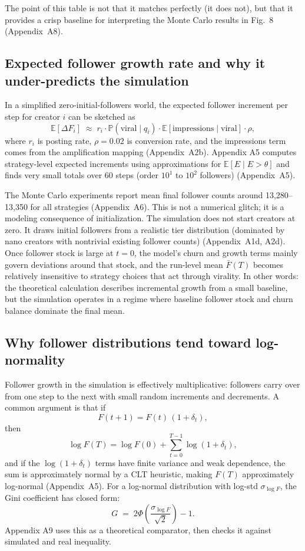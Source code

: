 \documentclass[10pt]{article}
\newcommand{\appref}[1]{(Appendix~#1)}
\newcommand{\figref}[1]{Fig.~#1}
\begin{document}
The point of this table is not that it matches perfectly (it does not), but that it provides a crisp baseline for interpreting the Monte Carlo results in \figref{8} \appref{A8}.

\subsection{Expected follower growth rate and why it under-predicts the simulation}
In a simplified zero-initial-followers world, the expected follower increment per step for creator \(i\) can be sketched as
\[
\mathbb{E}[\Delta F_i] \;\approx\; r_i \cdot \mathbb{P}(\text{viral}\mid q_i)\cdot \mathbb{E}[\text{impressions}\mid \text{viral}] \cdot \rho,
\]
where \(r_i\) is posting rate, \(\rho=0.02\) is conversion rate, and the impressions term comes from the amplification mapping \appref{A2b}. Appendix A5 computes strategy-level expected increments using approximations for \(\mathbb{E}[E\mid E>\theta]\) and finds very small totals over 60 steps (order \(10^1\) to \(10^2\) followers) \appref{A5}.

The Monte Carlo experiments report mean final follower counts around 13{,}280--13{,}350 for all strategies \appref{A6}. This is not a numerical glitch; it is a modeling consequence of initialization. The simulation does not start creators at zero. It draws initial followers from a realistic tier distribution (dominated by nano creators with nontrivial existing follower counts) \appref{A1d, A2d}. Once follower stock is large at \(t=0\), the model's churn and growth terms mainly govern deviations around that stock, and the run-level mean \(\bar{F}(T)\) becomes relatively insensitive to strategy choices that act through virality. In other words: the theoretical calculation describes incremental growth from a small baseline, but the simulation operates in a regime where baseline follower stock and churn balance dominate the final mean.

\subsection{Why follower distributions tend toward log-normality}
Follower growth in the simulation is effectively multiplicative: followers carry over from one step to the next with small random increments and decrements. A common argument is that if
\[
F(t+1) = F(t)\,(1+\delta_t),
\]
then
\[
\log F(T) = \log F(0) + \sum_{t=0}^{T-1} \log(1+\delta_t),
\]
and if the \(\log(1+\delta_t)\) terms have finite variance and weak dependence, the sum is approximately normal by a CLT heuristic, making \(F(T)\) approximately log-normal \appref{A5}. For a log-normal distribution with log-std \(\sigma_{\log F}\), the Gini coefficient has closed form:
\[
G \;=\; 2\Phi\!\left(\frac{\sigma_{\log F}}{\sqrt{2}}\right) - 1.
\]
Appendix A9 uses this as a theoretical comparator, then checks it against simulated and real inequality.
\end{document}
